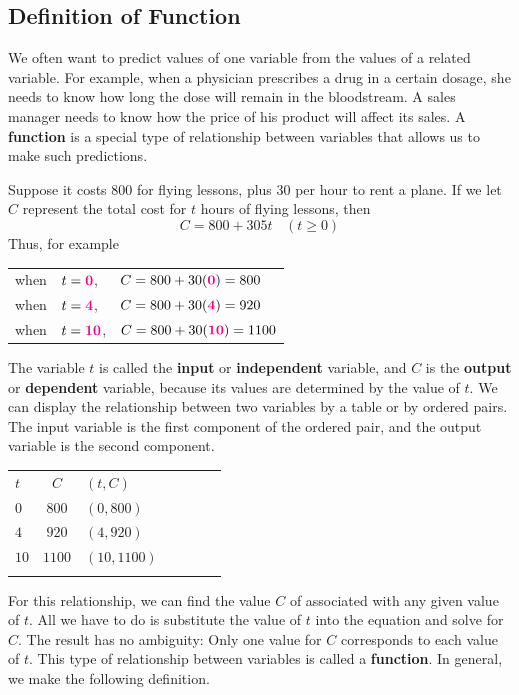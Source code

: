 \documentclass[10pt,]{book}
\newcommand{\terminology}[1]{\textbf{#1}}
\theoremstyle{plain}
\theoremstyle{definition}
\theoremstyle{definition}
\theoremstyle{definition}
\newcommand{\hrulethin}  {\noalign{\hrule height 0.04em}}
\newcommand{\hrulethick} {\noalign{\hrule height 0.11em}}
\newcommand{\alert}[1]{\boldsymbol{\color{magenta}{#1}}}
\begin{document}
\subsection[{Definition of Function}]{Definition of Function}\label{subsection-1}
We often want to predict values of one variable from the values of a related variable. For example, when a physician prescribes a drug in a certain dosage, she needs to know how long the dose will remain in the bloodstream. A sales manager needs to know how the price of his product will affect its sales. A \terminology{function} is a special type of relationship between variables that allows us to make such predictions.%
\par
Suppose it costs \textdollar{}800 for flying lessons, plus \textdollar{}30 per hour to rent a plane. If we let \(C\) represent the total cost for \(t\) hours of flying lessons, then%
\begin{equation*}
C=800+305t ~~~~ (t\ge 0)
\end{equation*}
Thus, for example%
\begin{table}
\centering
\begin{tabular}{rll}
when&\(t=\alert{0}\),&\(C=800+30(\alert{0})=800\)\tabularnewline[0pt]
when&\(t=\alert{4}\),&\(C=800+30(\alert{4})=920\)\tabularnewline[0pt]
when&\(t=\alert{10}\),&\(C=800+30(\alert{10})=1100\)
\end{tabular}
\end{table}
The variable \(t\) is called the \terminology{input} or \terminology{independent} variable, and \(C\) is the \terminology{output} or \terminology{dependent} variable, because its values are determined by the value of \(t\). We can display the relationship between two variables by a table or by ordered pairs. The input variable is the first component of the ordered pair, and the output variable is the second component.%
\begin{table}
\centering
\begin{tabular}{AcAcAcA}\hrulethick
\(t\)&\(C\)&\((t,C)\)\tabularnewline\hrulethin
\(0\)&\(800\)&\((0, 800)\)\tabularnewline\hrulethin
\(4\)&\(920\)&\((4, 920)\)\tabularnewline\hrulethin
\(10\)&\(1100\)&\((10,1100)\)\tabularnewline\hrulethin
\end{tabular}
\end{table}
For this relationship, we can find the value \(C\) of associated with any given value of \(t\). All we have to do is substitute the value of \(t\) into the equation and solve for \(C\). The result has no ambiguity: Only one value for \(C\) corresponds to each value of \(t\). This type of relationship between variables is called a \terminology{function}. In general, we make the following definition.%
\end{document}

